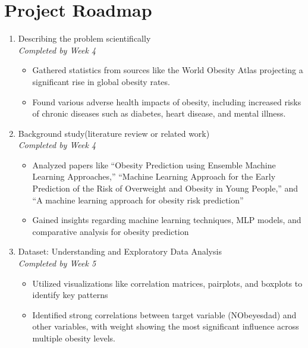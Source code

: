\documentclass[11pt]{article}
\begin{document}
\newpage
\section{Project Roadmap} 





\begin{enumerate}
    \item Describing the problem scientifically\\
    \emph{Completed by Week 4}
        \begin{itemize}
            \item Gathered statistics from sources like the World Obesity Atlas projecting a significant rise in global obesity rates.
            \item Found various adverse health impacts of obesity, including increased risks of chronic diseases such as diabetes, heart disease, and mental illness.
        \end{itemize} 

    \item Background study(literature review or related work) \\
    \emph{Completed by Week 4}
    \begin{itemize}
        \item Analyzed papers like “Obesity Prediction using Ensemble Machine Learning Approaches,” “Machine Learning Approach for the Early Prediction of the Risk of Overweight and Obesity in Young People,” and “A machine learning approach for obesity risk prediction”
        \item Gained insights regarding machine learning techniques, MLP models, and comparative analysis for obesity prediction 
    \end{itemize}
    
    \item Dataset: Understanding and Exploratory Data Analysis \\
    \emph{Completed by Week 5}
    \begin{itemize}
        \item Utilized visualizations like correlation matrices, pairplots, and boxplots to identify key patterns
        \item Identified strong correlations between target variable (NObeyesdad) and other variables, with weight showing the most significant influence across multiple obesity levels.
    \end{itemize} 
    

\end{enumerate}
\end{document}
